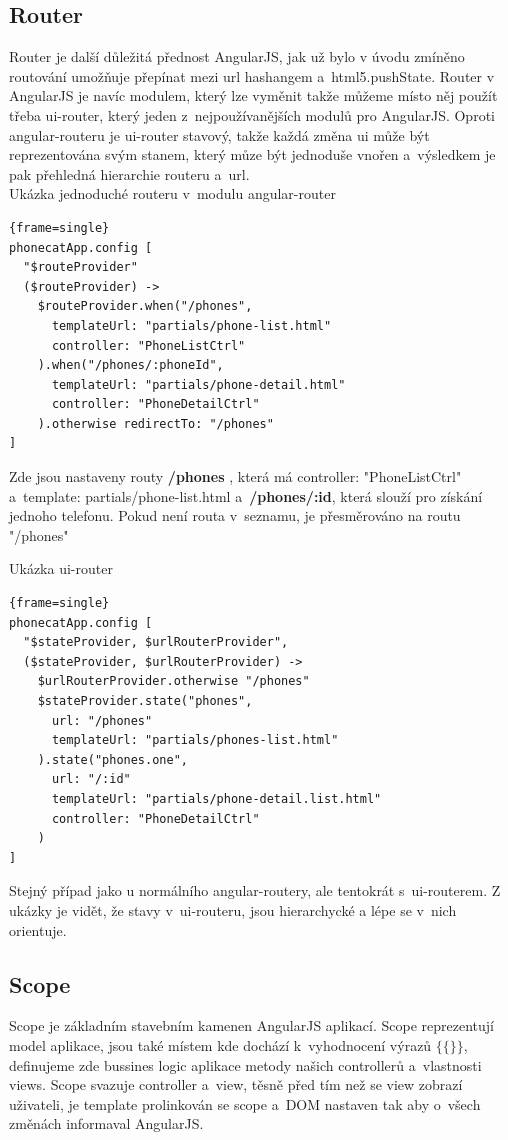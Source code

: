 \documentclass[a4paper,12pt,twoside,BCOR=10mm]{article}
\renewcommand{\b}[1]{\textbf{#1}} %
\newenvironment{codeframe}{%
  \begin{Sbox} 
    \begin{minipage} 
      {\columnwidth-\leftmargin-\rightmargin-2\fboxsep-2\fboxrule-4pt} 
}{%

  \end{minipage} 
  \end{Sbox} 
  \begin{center} 
    \fcolorbox{black}{codeback}{\TheSbox} 
  \end{center} 
}
\begin{document}
\subsection{Router}
Router je další důležitá přednost AngularJS, jak už bylo v úvodu zmíněno routování umožňuje přepínat mezi url hashangem a~html5.pushState. Router v AngularJS je navíc modulem, který lze vyměnit takže můžeme místo něj použít třeba ui-router, který jeden z~nejpoužívanějších modulů pro AngularJS. Oproti angular-routeru je ui-router stavový, takže každá změna ui může být reprezentována svým stanem, který můze být jednoduše vnořen a~výsledkem je pak přehledná hierarchie routeru a~url.\\

Ukázka jednoduché routeru v~modulu angular-router
     \begin{codeframe} 
      \begin{Verbatim}{frame=single}
phonecatApp.config [
  "$routeProvider"
  ($routeProvider) ->
    $routeProvider.when("/phones",
      templateUrl: "partials/phone-list.html"
      controller: "PhoneListCtrl"
    ).when("/phones/:phoneId",
      templateUrl: "partials/phone-detail.html"
      controller: "PhoneDetailCtrl"
    ).otherwise redirectTo: "/phones"
]
\end{Verbatim} 
    \end{codeframe}
Zde jsou nastaveny routy \b{/phones} , která má controller: "PhoneListCtrl" a~template: partials/phone-list.html a~\b{/phones/:id}, která slouží pro získání jednoho telefonu. Pokud není routa v~seznamu, je přesměrováno na routu "/phones"

Ukázka ui-router
     \begin{codeframe} 
      \begin{Verbatim}{frame=single}
phonecatApp.config [
  "$stateProvider, $urlRouterProvider",
  ($stateProvider, $urlRouterProvider) ->
    $urlRouterProvider.otherwise "/phones"
    $stateProvider.state("phones",
      url: "/phones"
      templateUrl: "partials/phones-list.html"
    ).state("phones.one",
      url: "/:id"
      templateUrl: "partials/phone-detail.list.html"
      controller: "PhoneDetailCtrl"
    )
]
\end{Verbatim} 
    \end{codeframe}
Stejný případ jako u normálního angular-routery, ale tentokrát s~ui-routerem. Z ukázky je vidět, že stavy v~ui-routeru, jsou hierarchycké a lépe se v~nich orientuje.\\

\subsection{Scope}
Scope je základním stavebním kamenen AngularJS aplikací. Scope reprezentují model aplikace, jsou také místem kde dochází k~vyhodnocení výrazů $\{\{ \}\}$, definujeme zde bussines logic aplikace metody našich controllerů a~vlastnosti views. Scope svazuje controller a~view, těsně před tím než se view zobrazí uživateli, je template prolinkován se scope a~DOM nastaven tak aby o~všech změnách informaval AngularJS.\cite{ngBOOK}\\
\end{document}
